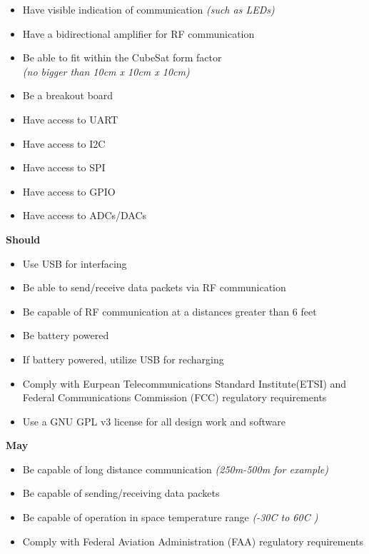 \documentclass[12pt]{article}
\begin{document}
\begin{description}
\begin{itemize}
			\item{Have visible indication of communication \textit{(such as LEDs)}}
			\item{Have a bidirectional amplifier for RF communication}
			\item{Be able to fit within the CubeSat form factor\\ \textit{(no bigger than 10cm x 10cm x 10cm)}}
			\item{Be a breakout board}
			\item{Have access to UART}
			\item{Have access to I2C}
			\item{Have access to SPI}
			\item{Have access to GPIO}
			\item{Have access to ADCs/DACs}
		\end{itemize}
		\textbf{Should}
		\begin{itemize}
			\item{Use USB for interfacing}
			\item{Be able to send/receive data packets via RF communication}
			\item{Be capable of RF communication at a distances greater than 6 feet}
			\item{Be battery powered}
			\item{If battery powered, utilize USB for recharging}
			\item{Comply with Eurpean Telecommunications Standard Institute(ETSI) and Federal Communications Commission (FCC) regulatory requirements}
			\item{Use a GNU GPL v3 license for all design work and software} 
		\end{itemize}
		\textbf{May}
		\begin{itemize}
			\item{Be capable of long distance communication \textit{(250m-500m for example)}}
			\item{Be capable of sending/receiving data packets}
			\item{Be capable of operation in space temperature range \textit{(-30C to 60C )}}
			\item{Comply with Federal Aviation Administration (FAA) regulatory requirements}
		\end{itemize}
\end{description}
\end{document}
